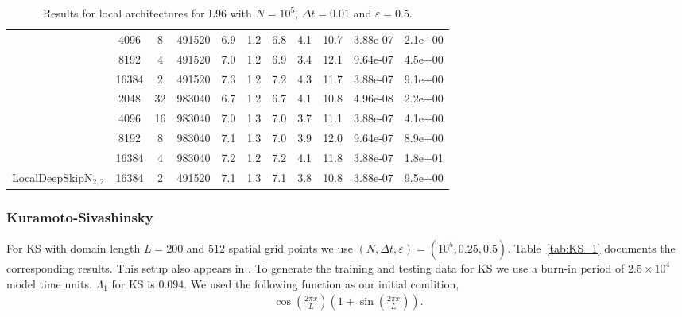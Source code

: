 \begin{table}[!htp]
\begin{tabular}{|c|c|c|c|c|c|c|c|c|c|c|}
 & 4096 & 8 & 491520 & 6.9 & 1.2 & 6.8 & 4.1 & 10.7 & 3.88e-07 & 2.1e+00\\ \cline{2-11}
 & 8192 & 4 & 491520 & 7.0 & 1.2 & 6.9 & 3.4 & 12.1 & 9.64e-07 & 4.5e+00\\ \cline{2-11}
 & \cellcolor{pink}16384 & \cellcolor{pink}2 & \cellcolor{pink}491520 & \cellcolor{pink}7.3 & \cellcolor{pink}1.2 & \cellcolor{pink}7.2 & \cellcolor{pink}4.3 & \cellcolor{pink}11.7 & \cellcolor{pink}3.88e-07 & \cellcolor{pink}9.1e+00\\ \cline{2-11}
 & 2048 & 32 & 983040 & 6.7 & 1.2 & 6.7 & 4.1 & 10.8 & 4.96e-08 & 2.2e+00\\ \cline{2-11}
 & 4096 & 16 & 983040 & 7.0 & 1.3 & 7.0 & 3.7 & 11.1 & 3.88e-07 & 4.1e+00\\ \cline{2-11}
 & 8192 & 8 & 983040 & 7.1 & 1.3 & 7.0 & 3.9 & 12.0 & 9.64e-07 & 8.9e+00\\ \cline{2-11}
 & 16384 & 4 & 983040 & 7.2 & 1.2 & 7.2 & 4.1 & 11.8 & 3.88e-07 & 1.8e+01\\ \cline{2-11}
\hline\hline
\multirow{1}{*}{LocalDeepSkipN$_{2,2}$} & \cellcolor{pink}16384 & \cellcolor{pink}2 & \cellcolor{pink}491520 & \cellcolor{pink}7.1 & \cellcolor{pink}1.3 & \cellcolor{pink}7.1 & \cellcolor{pink}3.8 & \cellcolor{pink}10.8 & \cellcolor{pink}3.88e-07 & \cellcolor{pink}9.5e+00\\ \cline{2-11}
\cline{1-2}
\end{tabular}
    \caption{Results for local architectures for L96 with $N=10^5$, $\Delta t=0.01$ and $\varepsilon=0.5$.}
    \label{tab:L96_1_s-l}
\end{table}


\subsubsection{Kuramoto-Sivashinsky}
\label{ssec:ap-KS}

For KS with domain length $L=200$ and $512$ spatial grid points we use $(N, \Delta t, \varepsilon) = (10^5, 0.25, 0.5)$. Table~\ref{tab:KS_1} documents the corresponding results. This setup also appears in \cite{vlachas2020backpropagation}. To generate the training and testing data for KS we use a burn-in period of $2.5\times10^4$ model time units. $\Lambda_1$ for KS is $0.094$. We used the following function as our initial condition,
\begin{align}
    \cos\left(\frac{2\pi x}{L}\right)\left(1+\sin\left(\frac{2\pi x}{L}\right)\right).
\end{align}

